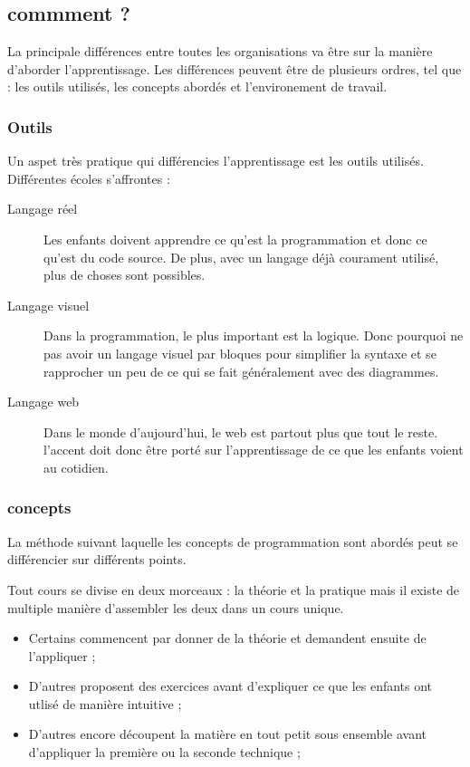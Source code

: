 \subsection{commment ?}
La principale différences entre toutes les organisations va être sur la manière d'aborder l'apprentissage. Les différences peuvent être de plusieurs ordres, tel que : les outils utilisés, les concepts abordés et l'environement de travail.

\subsubsection{Outils} Un aspet très pratique qui différencies l'apprentissage est les outils utilisés. Différentes écoles s'affrontes :
\begin{description}
  \item[Langage réel] Les enfants doivent apprendre ce qu'est la programmation et donc ce qu'est du code source. De plus, avec un langage déjà courament utilisé, plus de choses sont possibles.
  \item[Langage visuel] Dans la programmation, le plus important est la logique. Donc pourquoi ne pas avoir un langage visuel par bloques pour simplifier la syntaxe et se rapprocher un peu de ce qui se fait généralement avec des diagrammes.
  \item[Langage web] Dans le monde d'aujourd'hui, le web est partout plus que tout le reste. l'accent doit donc être porté sur l'apprentissage de ce que les enfants voient au cotidien.
\end{description}

\subsubsection{concepts} 
La méthode suivant laquelle les concepts de programmation sont abordés peut se différencier sur différents points.

Tout cours se divise en deux morceaux : la théorie et la pratique mais il existe de multiple manière d'assembler les deux dans un cours unique. 
\begin{itemize}
  \item Certains commencent par donner de la théorie et demandent ensuite de l'appliquer ;
  \item D'autres proposent des exercices avant d'expliquer ce que les enfants ont utlisé de manière intuitive ;
  \item D'autres encore découpent la matière en tout petit sous ensemble avant d'appliquer la première ou la seconde technique ;
\end{itemize}

